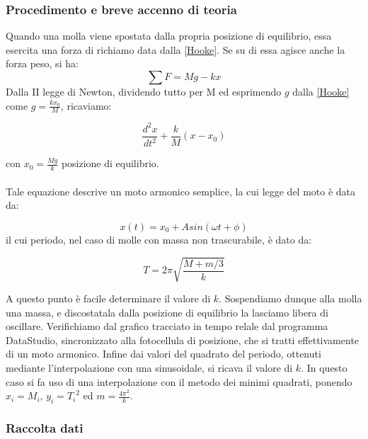 \subsubsection{Procedimento e breve accenno di teoria}

Quando una molla viene spostata dalla propria posizione di equilibrio, essa esercita una forza di richiamo data dalla \ref{Hooke}. Se su di essa agisce anche la forza peso, si ha:
$$\displaystyle\sum{F}=Mg-kx$$
Dalla II legge di Newton, dividendo tutto per M ed esprimendo $g$ dalla \ref{Hooke} come $g=\displaystyle{\frac{kx_0}{M}}$, ricaviamo:

\begin{equation}
\frac{d^2x}{dt^2}+\frac{k}{M}(x-x_0)
\end{equation}

con $x_0=\displaystyle{\frac{Mg}{k}}$ posizione di equilibrio.\\
\\
Tale equazione descrive un moto armonico semplice, la cui legge del moto è data da:

\begin{equation}\label{eqmoto}
x(t)=x_0+Asin(\omega t+\phi)
\end{equation} 
il cui periodo, nel caso di molle con massa non trascurabile, è dato da:

\begin{equation}\label{periodo}
T=2\pi\sqrt{\frac{M+m/3}{k}}
\end{equation}  

A questo punto è facile determinare il valore di $k$. Sospendiamo dunque alla molla una massa, e discostatala dalla posizione di equilibrio la lasciamo libera di oscillare. Verifichiamo dal grafico tracciato in tempo relale dal programma DataStudio, sincronizzato alla fotocellula di posizione, che si tratti effettivamente di un moto armonico. Infine dai valori del quadrato del periodo, ottenuti mediante l'interpolazione con una sinusoidale, si ricava il valore di $k$. In questo caso si fa uso di una interpolazione con il metodo dei minimi quadrati, ponendo $x_i=M_i$, $y_i={T_i}^2$ ed $m=\displaystyle{\frac{4\pi^2}{k}}$. 

\subsubsection{Raccolta dati}

